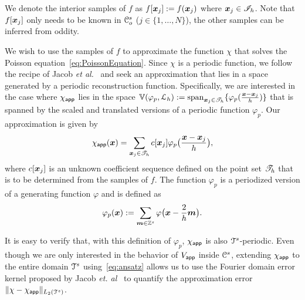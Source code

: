 We denote the interior samples of $f$ as $f[\vect{x}_j] := f(\vect{x}_j)$ where $\vect{x}_j \in \pointset{I}_h$. 
Note that $f[\vect{x}_j]$ only needs to be known in $\oucube^s$ ($j \in
\{1,\ldots,N\}$), the other samples can be inferred from oddity. 

We wish to use the samples of $f$ to approximate the function $\chi$ that solves the Poisson equation~\eqref{eq:PoissonEquation}. 
Since $\chi$ is a periodic function, we follow the recipe of Jacob \textit{et al.}~\cite{jacob02} and seek an approximation that lies in a space generated by a periodic reconstruction function. 
Specifically, we are interested in the case where $\appf{\chi}$ lies in the space $\aspace{\lattice{L}_h}{\varphi_p} := \mathrm{span}_{\vect{x}_j\in\pointset{T}_h}\{
\varphi_p(\frac{\vect{x}-\vect{x}_j}{h}) \}$ that is spanned by the scaled and translated versions of a periodic function $\varphi_p$. 
Our approximation is given by
\begin{equation}
  \appf{\chi}(\vect{x}) = \sum_{\vect{x}_j \in \pointset{T}_h} c[\vect{x}_j] 
\varphi_p\bigl(\frac{\vect{x} - \vect{x}_j}{h}\bigr),
\label{eq:ansatz}
\end{equation}
where $c[\vect{x}_j]$ is an unknown coefficient sequence defined on the point set $\pointset{T}_h$ that is to be determined from the samples of $f$. 
The function $\varphi_p$ is a periodized version of a generating function $\varphi$ and is defined as
\begin{equation}
\varphi_p(\vect{x}) := \sum_{\vect{m} \in \ints^s} 
\varphi\bigl(\vect{x} - \frac{2}{h} \vect{m} \bigr).
\label{eq:periodization}
\end{equation}


It is easy to verify that, with this definition of $\varphi_p$, $\appf{\chi}$ is also $\cube^s$-periodic. 
Even though we are only interested in the behavior of $\appf{V}$ inside $\ucube^s$, extending $\appf{\chi}$ to the entire domain $\cube^s$ using~\eqref{eq:ansatz} allows us to use the Fourier domain error kernel proposed by Jacob \textit{et. al}~\cite{jacob02} to quantify the approximation error $\LLnorm{\chi - \appf{\chi}}$.

